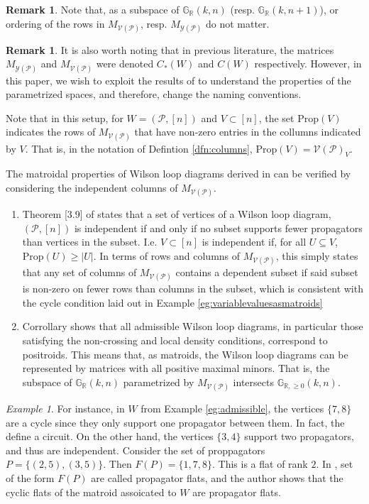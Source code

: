 \documentclass[11pt]{article}
\newcommand{\R}{\mathbb{R}}
\newcommand{\Gr}{\mathbb{G}_{\R, \geq 0}}
\newcommand{\Grall}{\mathbb{G}_{\R}}
\newcommand{\cP}{\mathcal{P}}
\newcommand{\cV}{\mathcal{V}}
\newcommand{\cY}{\mathcal{Y}}
\newcommand{\VP}{\cV(\cP)}
\newcommand{\YP}{\cY(\cP)}
\newcommand{\Prop}{\textrm{Prop}}
\theoremstyle{remark}
\newtheorem{eg}[thm]{Example}
\theoremstyle{definition}
\newtheorem{rmk}[thm]{Remark}
\begin{document}
 
\begin{rmk}
Note that, as a subspace of $\Grall(k, n)$ (resp. $\Grall(k, n+1)$), or ordering of the rows in $M_{\VP}$, resp. $M_{\YP}$ do not matter.
\end{rmk}

\begin{rmk}
It is also worth noting that in previous literature, the matrices $M_{\YP}$ and $M_{\VP}$ were denoted $C_*(W)$ and $C(W)$ respectively. However, in this paper, we wish to exploit the results of \cite{basisshapeloci} to understand the properties of the parametrized spaces, and therefore, change the naming conventions. 
\end{rmk}

Note that in this setup, for $W = (\cP, [n])$ and $V \subset [n]$, the set $\Prop(V)$ indicates the rows of $M_{\VP}$ that have non-zero entries in the collumns indicated by $V$. That is, in the notation of Defintion \ref{dfn:columns}, $\Prop(V) = \VP_V$. 

The matroidal properties of Wilson loop diagrams derived in \cite{Wilsonloops}  can be verified by considering the independent columns of $M_{\VP}$.
\begin{enumerate} 
\item Theorem [3.9] of \cite{wilsonloops} states that a set of vertices of a Wilson loop diagram, $(\cP, [n])$  is independent if and only if no subset supports fewer propagators than vertices in the subset. I.e. $V \subset [n]$ is independent if, for all $U \subseteq V$, $\Prop(U) \geq |U|$. In terms of rows and columns of $M_{\VP}$, this simply states that any set of columns of $M_{\VP}$ contains a dependent subset if said subset is non-zero on fewer rows than columns in the subset, which is consistent with the cycle condition laid out in Example \ref{eg:variablevaluesasmatroids}
\item Corrollary \cite[3.39]{wilsonloops} shows that all admissible Wilson loop diagrams, in particular those satisfying the non-crossing and local density conditions, correspond to positroids. This means that, as matroids, the Wilson loop diagrams can be represented by matrices with all positive maximal minors. That is, the subspace of $\Grall(k,n)$ parametrized by $M_{\VP}$ intersects $\Gr(k,n)$.
\end{enumerate}

\begin{eg}\label{eg:wldmatroid} For instance, in $W$  from Example \ref{eg:admissible}, the vertices $\{7,8\}$ are a cycle since they only support one propagator between them. In fact, the define a circuit. On the other hand, the vertices $\{3,4\}$ support two propagators, and thus are independent. Consider the set of proppagators $P = \{ (2, 5), (3, 5)\}$. Then $F(P) = \{ 1, 7, 8\}$. This is a flat of rank $2$. In \cite{wilsonloops}, set of the form $F(P)$ are called propagator flats, and the author shows that the cyclic flats of the matroid assoicated to $W$ are propagator flats.
\end{eg}
\end{document}
